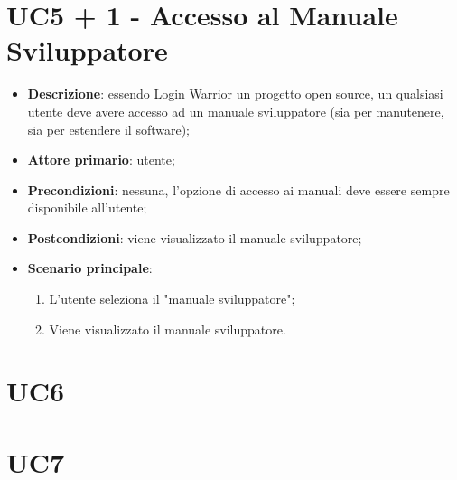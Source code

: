 \section{UC5 + 1 - Accesso al Manuale Sviluppatore}

\begin{itemize}
  \item \textbf{Descrizione}: essendo Login Warrior un progetto open source, un qualsiasi utente deve avere accesso ad un manuale sviluppatore (sia per manutenere, sia per estendere il software);
  \item \textbf{Attore primario}: utente;
  \item \textbf{Precondizioni}: nessuna, l'opzione di accesso ai manuali deve essere sempre disponibile all'utente;
  \item \textbf{Postcondizioni}: viene visualizzato il manuale sviluppatore;
  \item \textbf{Scenario principale}: 
  \begin{enumerate}
    \item L'utente seleziona il "manuale sviluppatore";
    \item Viene visualizzato il manuale sviluppatore.
  \end{enumerate}
\end{itemize}

\section{UC6}

\section{UC7}
